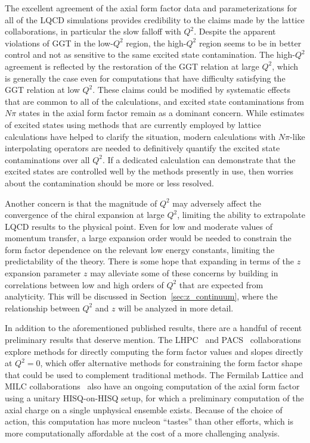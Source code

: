 \documentclass{ar-1col}
\begin{document}
The excellent agreement of the axial form factor data and parameterizations
 for all of the LQCD simulations provides credibility to the claims
 made by the lattice collaborations, in particular the slow falloff with $Q^2$.
Despite the apparent violations of GGT in the low-$Q^2$ region,
 the high-$Q^2$ region seems to be in better control and not as sensitive to
 the same excited state contamination.
The high-$Q^2$ agreement is reflected by the restoration of the GGT relation at large $Q^2$,
 which is generally the case even for computations that have difficulty satisfying
 the GGT relation at low $Q^2$.
These claims could be modified by systematic effects
 that are common to all of the calculations,
 and excited state contaminations from $N\pi$ states in
 the axial form factor remain as a dominant concern.
While estimates of excited states using methods that are currently employed
 by lattice calculations have helped to clarify the situation,
 modern calculations with $N\pi$-like interpolating operators
 are needed to definitively quantify the excited state contaminations over all $Q^2$.
If a dedicated calculation can demonstrate that the
 excited states are controlled well by the methods presently in use,
 then worries about the contamination should be more or less resolved.

Another concern is that the magnitude of $Q^2$ may adversely affect
 the convergence of the chiral expansion at large $Q^2$,
 limiting the ability to extrapolate LQCD results to the physical point.
Even for low and moderate values of momentum transfer,
 a large expansion order would be needed to constrain the form factor
 dependence on the relevant low energy constants,
 limiting the predictability of the theory.
There is some hope that expanding in terms of the $z$ expansion parameter $z$
 may alleviate some of these concerns by building in correlations between
 low and high orders of $Q^2$ that are expected from analyticity.
This will be discussed in Section~\ref{sec:z_continuum},
 where the relationship between $Q^2$ and $z$ will be analyzed in more detail.


In addition to the aforementioned published results, there are
 a handful of recent preliminary results that deserve mention.
The LHPC~\cite{Hasan:2017wwt} and PACS~\cite{Ishikawa:2021eut} collaborations
 explore methods for directly computing the form factor values and slopes
 directly at $Q^2=0$, which offer alternative methods for constraining
 the form factor shape that could be used to complement traditional methods.
The Fermilab Lattice and MILC collaborations~\cite{Meyer:2016kwb,Lin:2019pia,Lin:2020wko} also have an ongoing
 computation of the axial form factor using a unitary HISQ-on-HISQ setup,
 for which a preliminary computation of the axial charge on
 a single unphysical ensemble exists.
Because of the choice of action, this computation has more nucleon ``tastes''
 than other efforts, which is more computationally affordable
 at the cost of a more challenging analysis.
\end{document}
